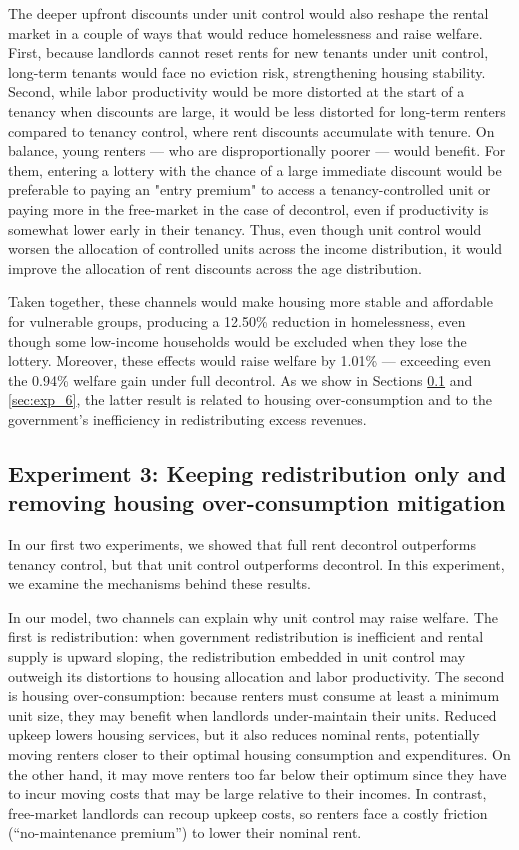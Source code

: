 \documentclass[parskip=full]{article}
\begin{document}
The deeper upfront discounts under unit control would also reshape the rental market in a couple of ways that would reduce homelessness and raise welfare. First, because landlords cannot reset rents for new tenants under unit control, long-term tenants would face no eviction risk, strengthening housing stability. Second, while labor productivity would be more distorted at the start of a tenancy when discounts are large, it would be less distorted for long-term renters compared to tenancy control, where rent discounts accumulate with tenure. On balance, young renters — who are disproportionally poorer — would benefit. For them, entering a lottery with the chance of a large immediate discount would be preferable to paying an "entry premium" to access a tenancy-controlled unit or paying more in the free-market in the case of decontrol, even if productivity is somewhat lower early in their tenancy. Thus, even though unit control would worsen the allocation of controlled units across the income distribution, it would improve the allocation of rent discounts across the age distribution. 

Taken together, these channels would make housing more stable and affordable for vulnerable groups, producing a 12.50\% reduction in homelessness, even though some low-income households would be excluded when they lose the lottery. Moreover, these effects would raise welfare by 1.01\% — exceeding even the 0.94\% welfare gain under full decontrol. As we show in Sections \ref{sec:exp_3} and \ref{sec:exp_6}, the latter result is related to housing over-consumption and to the government’s inefficiency in redistributing excess revenues.

\subsection{Experiment 3: Keeping redistribution only and removing housing over-consumption mitigation}\label{sec:exp_3}

In our first two experiments, we showed that full rent decontrol outperforms tenancy control, but that unit control outperforms decontrol. In this experiment, we examine the mechanisms behind these results.

In our model, two channels can explain why unit control may raise welfare. The first is redistribution: when government redistribution is inefficient and rental supply is upward sloping, the redistribution embedded in unit control may outweigh its distortions to housing allocation and labor productivity. The second is housing over-consumption: because renters must consume at least a minimum unit size, they may benefit when landlords under-maintain their units. Reduced upkeep lowers housing services, but it also reduces nominal rents, potentially moving renters closer to their optimal housing consumption and expenditures. On the other hand, it may move renters too far below their optimum since they have to incur moving costs that may be large relative to their incomes. In contrast, free-market landlords can recoup upkeep costs, so renters face a costly friction (“no-maintenance premium”) to lower their nominal rent.
\end{document}
